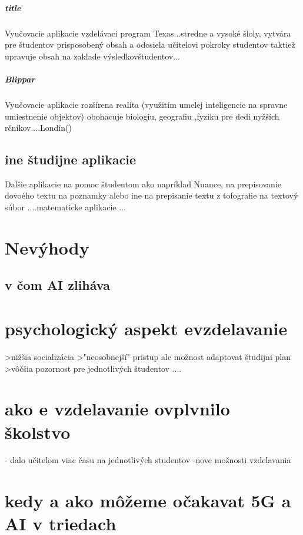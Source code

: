 \documentclass[10pt,oneside,sloak,a4paper]{article}
\begin{document}
\subparagraph{title}{Vyučovacie aplikacie}
vzdelávaci program Texas...stredne a vysoké šloly, vytvára pre študentov prisposobený obsah a odosiela učitelovi pokroky studentov taktiež upravuje obsah na zaklade výsledkovštudentov...



\subparagraph{Blippar}{Vyučovacie aplikacie}
rozšírena realita  (využitím umelej inteligencie na spravne umiestnenie objektov) obohacuje biologiu, geografiu ,fyziku pre dedi nyžších rčníkov....Londín()

\subsection{ine študijne aplikacie}
Dalšie aplikacie na pomoc študentom ako napríklad Nuance, na prepisovanie dovoého textu na poznamky alebo ine na prepisanie textu z tofografie na textový súbor ....matematicke aplikacie ...


\section{Nevýhody}

\subsection{v čom AI zliháva }

\section{psychologický aspekt evzdelavanie }
>nižšia socializácia 
>"neosobnejší" pristup ale možnost adaptovat študijni plan 
>vôčšia pozornost pre jednotlivých študentov ....

\section{ako e vzdelavanie ovplvnilo školstvo}
- dalo učitelom viac času na jednotlivých studentov 
-nove možnosti vzdelavania 

\section{kedy a ako môžeme očakavat 5G a AI v triedach}
\end{document}
